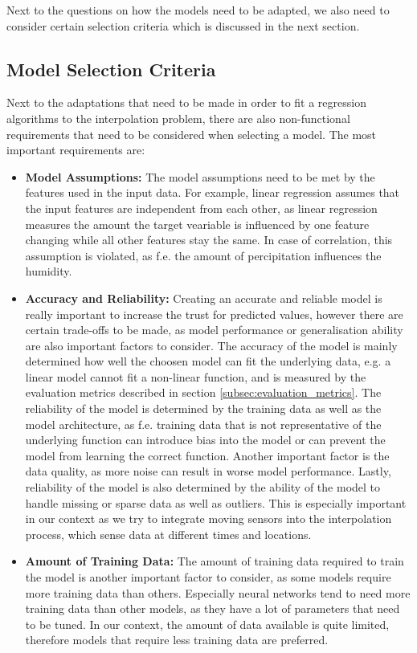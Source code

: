 Next to the questions on how the models need to be adapted, we also need to consider certain selection criteria which is discussed in the next section.

\subsection{Model Selection Criteria}

Next to the adaptations that need to be made in order to fit a regression algorithms to the interpolation problem, there are also non-functional requirements that need to be considered when selecting a model. The most important requirements are:

\begin{itemize}
    \item \textbf{Model Assumptions:} The model assumptions need to be met by the features used in the input data. For example, linear regression assumes that the input features are independent from each other, as linear regression measures the amount the target veariable is influenced by one feature changing while all other features stay the same. In case of correlation, this assumption is violated, as f.e. the amount of percipitation influences the humidity.
    \item \textbf{Accuracy and Reliability:} Creating an accurate and reliable model is really important to increase the trust for predicted values, however there are certain trade-offs to be made, as model performance or generalisation ability are also important factors to consider.
    The accuracy of the model is mainly determined how well the choosen model can fit the underlying data, e.g. a linear model cannot fit a non-linear function, and is measured by the evaluation metrics described in section \ref{subsec:evaluation_metrics}.
    The reliability of the model is determined by the training data as well as the model architecture, as f.e. training data that is not representative of the underlying function can introduce bias into the model or can prevent the model from learning the correct function. Another important factor is the data quality, as more noise can result in worse model performance. Lastly, reliability of the model is also determined by the ability of the model to handle missing or sparse data as well as outliers. This is especially important in our context as we try to integrate moving sensors into the interpolation process, which sense data at different times and locations.
    \item \textbf{Amount of Training Data:} The amount of training data required to train the model is another important factor to consider, as some models require more training data than others. Especially neural networks tend to need more training data than other models, as they have a lot of parameters that need to be tuned. In our context, the amount of data available is quite limited, therefore models that require less training data are preferred.

\end{itemize}
